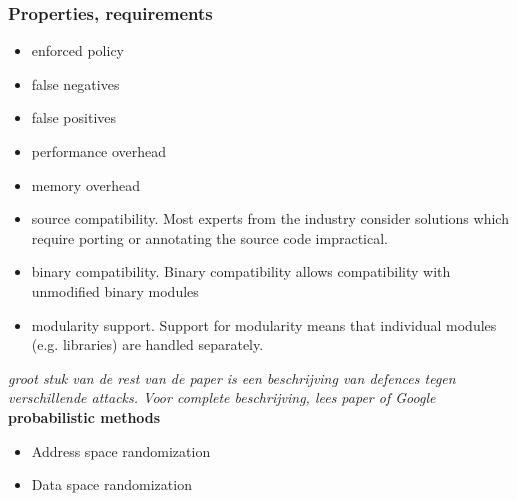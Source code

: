 \documentclass{article}
\begin{document}
\subsubsection{Properties, requirements} 
\begin{itemize}
\item enforced policy 
\item false negatives
\item false positives
\item performance overhead 
\item memory overhead 
\item source compatibility. Most experts from the industry consider solutions which require porting or annotating the source code impractical.
\item binary compatibility. Binary compatibility allows compatibility with unmodified binary modules
\item modularity support. Support for modularity means that individual modules (e.g. libraries) are handled separately.
\end{itemize}

\textit{groot stuk van de rest van de paper is een beschrijving van defences tegen verschillende attacks. Voor complete beschrijving, lees paper of Google}
\textbf{probabilistic methods}
\begin{itemize}
\item Address space randomization
\item Data space randomization
\end{itemize}
\end{document}
